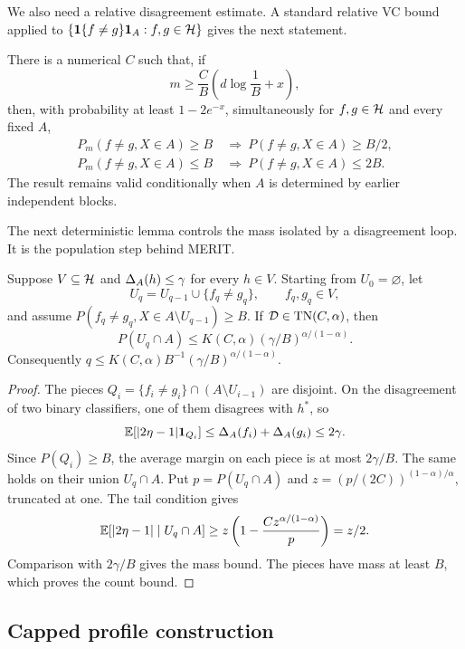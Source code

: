 We also need a relative disagreement estimate. A standard relative VC bound applied to $\{\mathbf 1\{f\ne g\}\mathbf 1_A:f,g\in\mathcal H\}$ gives the next statement.

\begin{lemma}
\label{lem:relative-vc}
There is a numerical $C$ such that, if
\[
 m\geq\frac{C}{B}\left(d\log\frac1B+x\right),
\]
then, with probability at least $1-2e^{-x}$, simultaneously for $f,g\in\mathcal H$ and every fixed $A$,
\begin{align*}
 P_m(f\ne g,X\in A)\geq B&\ \Longrightarrow\
 P(f\ne g,X\in A)\geq B/2,\\
 P_m(f\ne g,X\in A)\leq B&\ \Longrightarrow\
 P(f\ne g,X\in A)\leq2B.
\end{align*}
The result remains valid conditionally when $A$ is determined by earlier independent blocks.
\end{lemma}

The next deterministic lemma controls the mass isolated by a disagreement loop. It is the population step behind MERIT.

\begin{lemma}
\label{lem:region-mass}
Suppose $V\subseteq\mathcal H$ and $\Delta_A(h)\leq\gamma$ for every $h\in V$. Starting from $U_0=\varnothing$, let
\[
 U_q=U_{q-1}\cup\{f_q\ne g_q\},
 \qquad f_q,g_q\in V,
\]
and assume $P(f_q\ne g_q,X\in A\setminus U_{q-1})\geq B$. If $\mathcal D\in\mathrm{TN}(C,\alpha)$, then
\[
 P(U_q\cap A)\leq K(C,\alpha)(\gamma/B)^{\alpha/(1-\alpha)}.
\]
Consequently $q\leq K(C,\alpha)B^{-1}(\gamma/B)^{\alpha/(1-\alpha)}$.
\end{lemma}

\begin{proof}
The pieces $Q_i=\{f_i\ne g_i\}\cap(A\setminus U_{i-1})$ are disjoint. On the disagreement of two binary classifiers, one of them disagrees with $h^*$, so
\[
 \mathbb E[|2\eta-1|\mathbf 1_{Q_i}]
 \leq\Delta_A(f_i)+\Delta_A(g_i)\leq2\gamma.
\]
Since $P(Q_i)\geq B$, the average margin on each piece is at most $2\gamma/B$. The same holds on their union $U_q\cap A$. Put $p=P(U_q\cap A)$ and $z=(p/(2C))^{(1-\alpha)/\alpha}$, truncated at one. The tail condition gives
\[
 \mathbb E[|2\eta-1|\mid U_q\cap A]
 \geq z\left(1-\frac{Cz^{\alpha/(1-\alpha)}}p\right)
 =z/2.
\]
Comparison with $2\gamma/B$ gives the mass bound. The pieces have mass at least $B$, which proves the count bound.
\end{proof}

\subsection{Capped profile construction}

